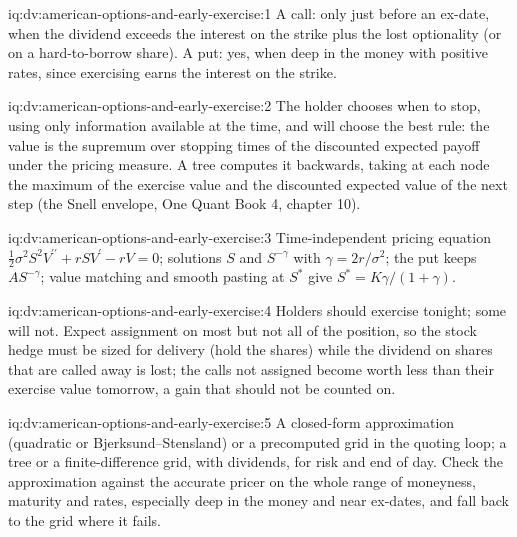 \begin{solution}{iq:dv:american-options-and-early-exercise:1}
A call: only just before an ex-date, when the dividend exceeds the interest on the
strike plus the lost optionality (or on a hard-to-borrow share). A put: yes, when deep in the
money with positive rates, since exercising earns the interest on the strike.
\end{solution}

\begin{solution}{iq:dv:american-options-and-early-exercise:2}
The holder chooses when to stop, using only information available at the time, and will
choose the best rule: the value is the supremum over stopping times of the discounted
expected payoff under the pricing measure. A tree computes it backwards, taking at each node
the maximum of the exercise value and the discounted expected value of the next step (the
Snell envelope, One Quant Book 4, chapter 10).
\end{solution}

\begin{solution}{iq:dv:american-options-and-early-exercise:3}
Time-independent pricing equation $\tfrac12\sigma^2S^2V^{\prime\prime}+rSV^{\prime}-rV=0$; solutions $S$ and
$S^{-\gamma}$ with $\gamma=2r/\sigma^2$; the put keeps $AS^{-\gamma}$; value matching and
smooth pasting at $S^*$ give $S^*=K\gamma/(1+\gamma)$.
\end{solution}

\begin{solution}{iq:dv:american-options-and-early-exercise:4}
Holders should exercise tonight; some will not. Expect assignment on most but not all of the
position, so the stock hedge must be sized for delivery (hold the shares) while the dividend
on shares that are called away is lost; the calls not assigned become worth less than their
exercise value tomorrow, a gain that should not be counted on.
\end{solution}

\begin{solution}{iq:dv:american-options-and-early-exercise:5}
A closed-form approximation (quadratic or Bjerksund--Stensland) or a precomputed grid in
the quoting loop; a tree or a finite-difference grid, with dividends, for risk and end of
day. Check the approximation against the accurate pricer on the whole range of moneyness,
maturity and rates, especially deep in the money and near ex-dates, and fall back to the
grid where it fails.
\end{solution}

